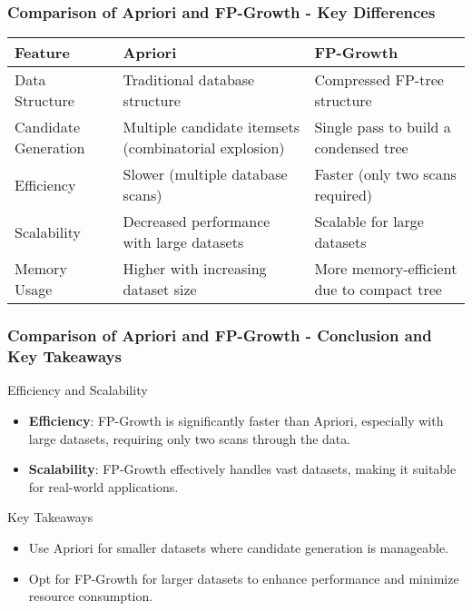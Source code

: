 \documentclass[aspectratio=169]{beamer}
\begin{document}
\begin{frame}[fragile]
    \frametitle{Comparison of Apriori and FP-Growth - Key Differences}
    \begin{table}[ht]
        \centering
        \begin{tabular}{|l|l|l|}
            \hline
            \textbf{Feature}            & \textbf{Apriori}                                      & \textbf{FP-Growth}                                   \\ \hline
            Data Structure              & Traditional database structure                        & Compressed FP-tree structure                         \\ \hline
            Candidate Generation         & Multiple candidate itemsets (combinatorial explosion) & Single pass to build a condensed tree                \\ \hline
            Efficiency                  & Slower (multiple database scans)                      & Faster (only two scans required)                     \\ \hline
            Scalability                 & Decreased performance with large datasets             & Scalable for large datasets                           \\ \hline
            Memory Usage                & Higher with increasing dataset size                   & More memory-efficient due to compact tree            \\ \hline
        \end{tabular}
    \end{table}
\end{frame}

\begin{frame}[fragile]
    \frametitle{Comparison of Apriori and FP-Growth - Conclusion and Key Takeaways}
    \begin{block}{Efficiency and Scalability}
        \begin{itemize}
            \item \textbf{Efficiency}: FP-Growth is significantly faster than Apriori, especially with large datasets, requiring only two scans through the data.
            \item \textbf{Scalability}: FP-Growth effectively handles vast datasets, making it suitable for real-world applications.
        \end{itemize}
    \end{block}

    \begin{block}{Key Takeaways}
        \begin{itemize}
            \item Use Apriori for smaller datasets where candidate generation is manageable.
            \item Opt for FP-Growth for larger datasets to enhance performance and minimize resource consumption.
        \end{itemize}
    \end{block}
\end{frame}
\end{document}
